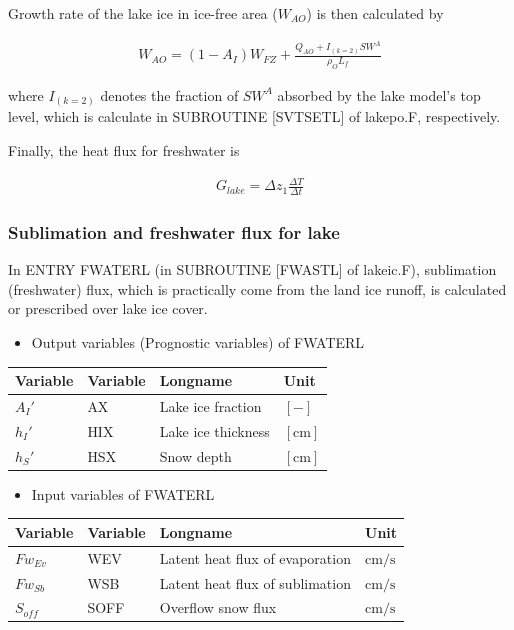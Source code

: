 Growth rate of the lake ice in ice-free area (\(W_{AO}\)) is then calculated by

\begin{eqnarray}
    W_{AO} = (1-A_I)W_{FZ} + \frac{Q_{AO}+I_{(k=2)} SW^A}{\rho_O L_f}
\end{eqnarray}

where \(I_{(k=2)}\) denotes the fraction of \(SW^A\) absorbed by the lake model's top level, which is calculate in SUBROUTINE {[}SVTSETL{]} of lakepo.F, respectively.

Finally, the heat flux for freshwater is

\begin{eqnarray}
    G_{lake} = \Delta z_1 \frac{\Delta T }{\Delta t}
\end{eqnarray}

\subsubsection{Sublimation and freshwater flux for lake}\label{sublimation-and-freshwater-flux-for-lake}

In ENTRY FWATERL (in SUBROUTINE {[}FWASTL{]} of lakeic.F), sublimation (freshwater) flux, which is practically come from the land ice runoff, is calculated or prescribed over lake ice cover.

\begin{itemize}
\tightlist
\item
  Output variables (Prognostic variables) of FWATERL
\end{itemize}

\begin{longtable}[]{@{}llll@{}}
\toprule\noalign{}
Variable & Variable & Longname & Unit \\
\midrule\noalign{}
\endhead
\bottomrule\noalign{}
\endlastfoot
\(A_I'\) & AX & Lake ice fraction & \(\mathrm{[-]}\) \\
\(h_I'\) & HIX & Lake ice thickness & \(\mathrm{[cm]}\) \\
\(h_S'\) & HSX & Snow depth & \(\mathrm{[cm]}\) \\
\end{longtable}

\begin{itemize}
\tightlist
\item
  Input variables of FWATERL
\end{itemize}

\begin{longtable}[]{@{}llll@{}}
\toprule\noalign{}
Variable & Variable & Longname & Unit \\
\midrule\noalign{}
\endhead
\bottomrule\noalign{}
\endlastfoot
\(Fw_{Ev}\) & WEV & Latent heat flux of evaporation & \(\mathrm{cm/s}\) \\
\(Fw_{Sb}\) & WSB & Latent heat flux of sublimation & \(\mathrm{cm/s}\) \\
\(S_{off}\) & SOFF & Overflow snow flux & \(\mathrm{cm/s}\) \\
\end{longtable}

